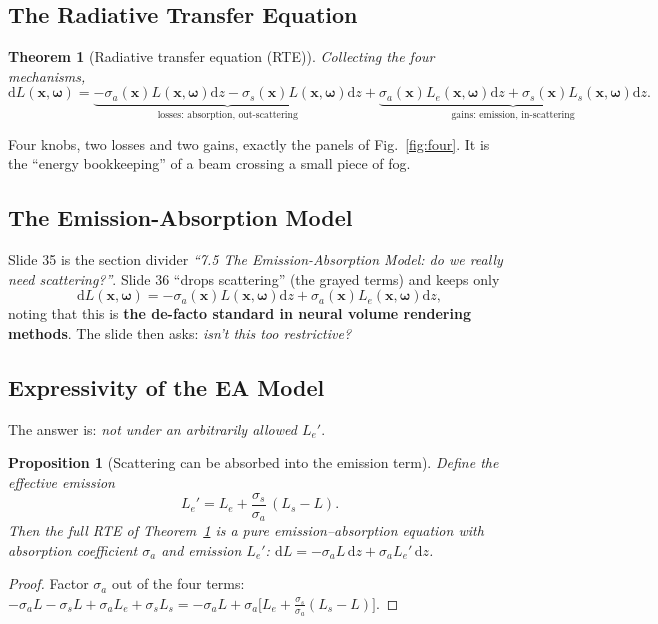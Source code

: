 \documentclass[11pt,a4paper]{article}
\newcommand{\x}{{\bm{x}}}
\newcommand{\w}{{\bm{\omega}}}
\theoremstyle{definition}
\theoremstyle{plain}
\newtheorem{theorem}[definition]{Theorem}
\newtheorem{proposition}[definition]{Proposition}
\theoremstyle{remark}
\begin{document}
\subsection{The Radiative Transfer Equation}

\begin{theorem}[Radiative transfer equation (RTE)]\label{thm:rte}
Collecting the four mechanisms,
\[
\mathrm dL(\x,\w)=\underbrace{-\sigma_a(\x)L(\x,\w)\mathrm dz-\sigma_s(\x)L(\x,\w)\mathrm dz}_{\text{losses: absorption, out-scattering}}
+\underbrace{\sigma_a(\x)L_e(\x,\w)\mathrm dz+\sigma_s(\x)L_s(\x,\w)\mathrm dz}_{\text{gains: emission, in-scattering}} .
\]
\end{theorem}

\begin{intuition}
Four knobs, two losses and two gains, exactly the panels of Fig.~\ref{fig:four}. It is the ``energy bookkeeping'' of a beam crossing a small piece of fog.
\end{intuition}

\subsection{The Emission-Absorption Model}

Slide 35 is the section divider \emph{``7.5 The Emission-Absorption Model: do we really need scattering?''}. Slide 36 ``drops scattering'' (the grayed terms) and keeps only
\[
\mathrm dL(\x,\w)=-\sigma_a(\x)L(\x,\w)\mathrm dz+\sigma_a(\x)L_e(\x,\w)\mathrm dz ,
\]
noting that this is \textbf{the de-facto standard in neural volume rendering methods}. The slide then asks: \emph{isn't this too restrictive?}

\subsection{Expressivity of the EA Model}

The answer is: \emph{not under an arbitrarily allowed $L_e'$}.

\begin{proposition}[Scattering can be absorbed into the emission term]\label{prop:expr}
Define the \emph{effective emission}
\[
L_e'=L_e+\frac{\sigma_s}{\sigma_a}\,(L_s-L).
\]
Then the full RTE of Theorem~\ref{thm:rte} is a pure emission--absorption equation with absorption coefficient $\sigma_a$ and emission $L_e'$:
$\mathrm dL=-\sigma_aL\,\mathrm dz+\sigma_aL_e'\,\mathrm dz$.
\end{proposition}
\begin{proof}
Factor $\sigma_a$ out of the four terms:
$-\sigma_aL-\sigma_sL+\sigma_aL_e+\sigma_sL_s=-\sigma_aL+\sigma_a\bigl[L_e+\tfrac{\sigma_s}{\sigma_a}(L_s-L)\bigr]$.
\end{proof}
\end{document}
